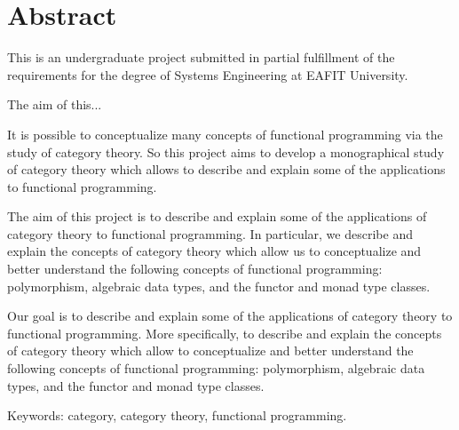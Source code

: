 \chapter{Abstract}

This is an undergraduate project submitted in partial fulfillment of
the requirements for the degree of Systems Engineering at EAFIT
University.

The aim of this... %

It is possible to conceptualize many concepts of functional
programming via the study of category theory. So this project aims to
develop a monographical study of category theory which allows to
describe and explain some of the applications to functional
programming.

The aim of this project is to describe and explain some of the
applications of category theory to functional programming. In
particular, we describe and explain the concepts of category theory
which allow us to conceptualize and better understand the following
concepts of functional programming: polymorphism, algebraic data
types, and the functor and monad type classes.

Our goal is to describe and explain some of the applications of
category theory to functional programming. More specifically, to
describe and explain the concepts of category theory which allow to
conceptualize and better understand the following concepts of
functional programming: polymorphism, algebraic data types, and the
functor and monad type classes.





\vspace{1em}
\noindent
Keywords: category, category theory, functional programming.

\clearemptydoublepage
